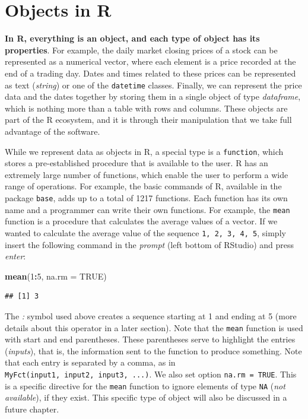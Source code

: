 \documentclass[11pt,]{book}
\newenvironment{Shaded}{\begin{snugshade}}{\end{snugshade}}
\newcommand{\KeywordTok}[1]{\textcolor[rgb]{0.27,0.27,0.27}{\textbf{#1}}}
\newcommand{\DataTypeTok}[1]{\textcolor[rgb]{0.27,0.27,0.27}{#1}}
\newcommand{\DecValTok}[1]{\textcolor[rgb]{0.06,0.06,0.06}{#1}}
\newcommand{\OtherTok}[1]{\textcolor[rgb]{0.56,0.35,0.01}{#1}}
\newcommand{\OperatorTok}[1]{\textcolor[rgb]{0.81,0.36,0.00}{\textbf{#1}}}
\newcommand{\NormalTok}[1]{#1}
\begin{document}
\section{Objects in R}\label{objects-in-r}

\textbf{In R, everything is an object, and each type of object has its
properties}. For example, the daily market closing prices of a stock can
be represented as a numerical vector, where each element is a price
recorded at the end of a trading day. Dates and times related to these
prices can be represented as text (\emph{string}) or one of the
\texttt{datetime} classes. Finally, we can represent the price data and
the dates together by storing them in a single object of type
\emph{dataframe}, which is nothing more than a table with rows and
columns. These objects are part of the R ecosystem, and it is through
their manipulation that we take full advantage of the software.

While we represent data as objects in R, a special type is a
\texttt{function}, which stores a pre-established procedure that is
available to the user. R has an extremely large number of functions,
which enable the user to perform a wide range of operations. For
example, the basic commands of R, available in the package
\texttt{base}, adds up to a total of 1217 functions. Each function has
its own name and a programmer can write their own functions. For
example, the \texttt{mean} function is a procedure that calculates the
average values of a vector. If we wanted to calculate the average value
of the sequence \texttt{1,\ 2,\ 3,\ 4,\ 5}, simply insert the following
command in the \emph{prompt} (left bottom of RStudio) and press
\emph{enter}:  

\begin{Shaded}
\begin{Highlighting}[]
\KeywordTok{mean}\NormalTok{(}\DecValTok{1}\OperatorTok{:}\DecValTok{5}\NormalTok{, }\DataTypeTok{na.rm =} \OtherTok{TRUE}\NormalTok{)}
\end{Highlighting}
\end{Shaded}

\begin{verbatim}
## [1] 3
\end{verbatim}

The \emph{:} symbol used above creates a sequence starting at 1 and
ending at 5 (more details about this operator in a later section). Note
that the \texttt{mean} function is used with start and end parentheses.
These parentheses serve to highlight the entries (\emph{inputs}), that
is, the information sent to the function to produce something. Note that
each entry is separated by a comma, as in
\texttt{MyFct(input1,\ input2,\ input3,\ ...)}. We also set option
\texttt{na.rm\ =\ TRUE}. This is a specific directive for the
\texttt{mean} function to ignore elements of type \texttt{NA} (\emph{not
available}), if they exist. This specific type of object will also be
discussed in a future chapter.
\end{document}
